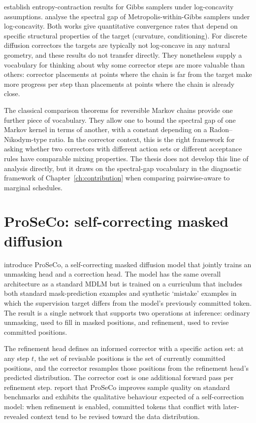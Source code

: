 \textcite{ascolani2024entropycontraction} establish entropy-contraction
results for Gibbs samplers under log-concavity assumptions.
\textcite{secchi2025mwggap} analyse the spectral gap of
Metropolis-within-Gibbs samplers under log-concavity. Both works give
quantitative convergence rates that depend on specific structural
properties of the target (curvature, conditioning). For discrete
diffusion correctors the targets are typically not log-concave in any
natural geometry, and these results do not transfer directly. They
nonetheless supply a vocabulary for thinking about why some corrector
steps are more valuable than others: corrector placements at points
where the chain is far from the target make more progress per step than
placements at points where the chain is already close.

The classical comparison theorems for reversible Markov chains
\parencite{diaconis1993comparison} provide one further piece of vocabulary.
They allow one to bound the spectral gap of one Markov kernel in terms of
another, with a constant depending on a Radon--Nikodym-type ratio. In the
corrector context, this is the right framework for asking whether two
correctors with different action sets or different acceptance rules have
comparable mixing properties. The thesis does not develop this line of
analysis directly, but it draws on the spectral-gap vocabulary in the
diagnostic framework of Chapter~\ref{ch:contribution} when comparing
pairwise-aware to marginal schedules.

\section{ProSeCo: self-correcting masked diffusion}
\label{lit:sec:proseco}

\textcite{schiff2026proseco} introduce ProSeCo, a self-correcting masked
diffusion model that jointly trains an unmasking head and a correction
head. The model has the same overall architecture as a standard MDLM but
is trained on a curriculum that includes both standard mask-prediction
examples and synthetic `mistake' examples in which the supervision target
differs from the model's previously committed token. The result is a
single network that supports two operations at inference: ordinary
unmasking, used to fill in masked positions, and refinement, used to
revise committed positions.

The refinement head defines an informed corrector with a specific action
set: at any step $t$, the set of revisable positions is the set of
currently committed positions, and the corrector resamples those positions
from the refinement head's predicted distribution. The corrector cost is
one additional forward pass per refinement step.
\textcite{schiff2026proseco} report that ProSeCo improves sample quality
on standard benchmarks and exhibits the qualitative behaviour expected of
a self-correction model: when refinement is enabled, committed tokens that
conflict with later-revealed context tend to be revised toward the data
distribution.

